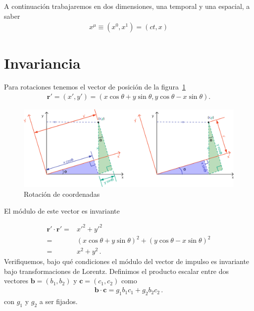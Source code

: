 \documentclass[11pt,a4paper]{article}
\begin{document}
A continuación trabajaremos en dos dimensiones, una temporal y una espacial, a saber
\begin{align}
    x^\mu \equiv \left(x^0, x^1 \right) = \left(ct, x \right)
\end{align}

\section{Invariancia}
Para rotaciones tenemos el vector de posición de la figura~\ref{fig:rot}
\begin{align*}
    \boldsymbol{r}' = (x',y')=  (x\cos\theta+y\sin\theta,y\cos\theta-x\sin\theta).
\end{align*}

\begin{figure}
    \centering
    \includegraphics[width=1\linewidth]{so2}
    \caption{Rotación de coordenadas}
    \label{fig:rot}
\end{figure}

El módulo de este vector es invariante

\begin{align*}
    \boldsymbol{r}'\cdot\boldsymbol{r}' =&{x'}^2+{y'}^2  \\
    =&(x\cos\theta+y\sin\theta)^2+(y\cos\theta-x\sin\theta)^2\\
    = & x^2+y^2\,.
\end{align*}
Verifiquemos, bajo qué condiciones el módulo del vector de impulso es invariante bajo transformaciones de Lorentz. Definimos el producto escalar entre dos vectores
$\boldsymbol{b} = (b_1,b_2)$ y $\boldsymbol{c} = (c_1,c_2) $ como
\begin{align}
    \boldsymbol{b} \cdot \boldsymbol{c} = g_{1} b_1 c_1 + g_{2} b_2 c_2\,.
\end{align}
con $g_{1}$ y $g_{2}$ a ser fijados. 
\end{document}
